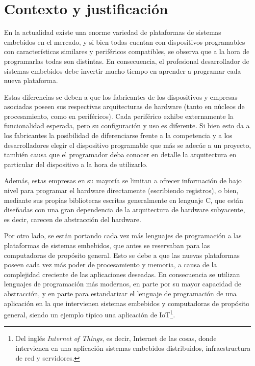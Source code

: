 \section{Contexto y justificación}
\label{sec:contextoYJustificacion}

En la actualidad existe una enorme variedad de plataformas de sistemas embebidos en el mercado, y si bien todas cuentan con dispositivos programables con características similares y periféricos compatibles, se observa que a la hora de programarlas todas son distintas. En consecuencia, el profesional desarrollador de sistemas embebidos debe invertir mucho tiempo en aprender a programar cada nueva plataforma.

Estas diferencias se deben a que los fabricantes de los dispositivos y empresas asociadas poseen sus respectivas arquitecturas de hardware (tanto en núcleos de procesamiento, como en periféricos). Cada periférico exhibe externamente la funcionalidad esperada, pero su configuración y uso es diferente. Si bien esto da a los fabricantes la posibilidad de diferenciarse frente a la competencia y a los desarrolladores elegir el dispositivo programable que más se adecúe a un proyecto, también causa que el programador deba conocer en detalle la arquitectura en particular del dispositivo a la hora de utilizarlo.

Además, estas empresas en su mayoría se limitan a ofrecer información de bajo nivel para programar el hardware directamente (escribiendo registros), o bien, mediante sus propias bibliotecas escritas generalmente en lenguaje C, que están diseñadas con una gran dependencia de la arquitectura de hardware subyacente, es decir, carecen de abstracción del hardware.

Por otro lado, se están portando cada vez más lenguajes de programación a las plataformas de sistemas embebidos, que antes se reservaban para las computadoras de propósito general. Esto se debe a que las nuevas plataformas poseen cada vez más poder de procesamiento y memoria, a causa de la complejidad creciente de las aplicaciones deseadas. En consecuencia se utilizan lenguajes de programación más modernos, en parte por su mayor capacidad de abstracción, y en parte para estandarizar el lenguaje de programación de una aplicación en la que intervienen sistemas embebidos y computadoras de propósito general, siendo un ejemplo típico una aplicación de IoT\footnote{Del inglés \emph{Internet of Things}, es decir, Internet de las cosas, donde intervienen en una aplicación sistemas embebidos distribuidos, infraestructura de red y servidores.}.

